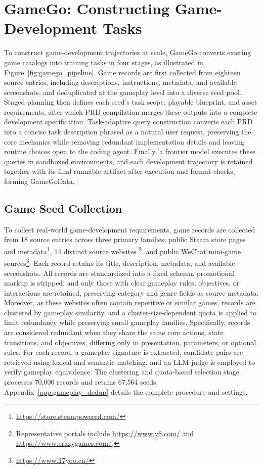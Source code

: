 \documentclass{article}
\begin{document}
\vspace{-3pt}
\section{GameGo: Constructing Game-Development Tasks}
\label{sec:method}
\vspace{-3pt}

To construct game-development trajectories at scale, GameGo converts existing game catalogs into training tasks in four stages, as illustrated in Figure~\ref{fig:gamego_pipeline}. Game records are first collected from eighteen source entries, including descriptions, instructions, metadata, and available screenshots, and deduplicated at the gameplay level into a diverse seed pool. Staged planning then defines each seed's task scope, playable blueprint, and asset requirements, after which PRD compilation merges these outputs into a complete development specification. Task-adaptive query construction converts each PRD into a concise task description phrased as a natural user request, preserving the core mechanics while removing redundant implementation details and leaving routine choices open to the coding agent. Finally, a frontier model executes these queries in sandboxed environments, and each development trajectory is retained together with its final runnable artifact after execution and format checks, forming GameGoData.

\vspace{-3pt}
\subsection{Game Seed Collection}
\label{sec:seed_collection}
\vspace{-3pt}

To collect real-world game-development requirements, game records are collected from 18 source entries across three primary families: public Steam store pages and metadata\footnote{\url{https://store.steampowered.com/}}, 14 distinct source websites \footnote{Representative portals include \url{https://www.y8.com/} and \url{https://www.crazygames.com/}.}, and public WeChat mini-game sources\footnote{\url{https://www.17yoo.cn/}}. Each record retains its title, description, metadata, and available screenshots. All records are standardized into a fixed schema, promotional markup is stripped, and only those with clear gameplay rules, objectives, or interactions are retained, preserving category and genre fields as source metadata. Moreover, as these websites often contain repetitive or similar games, records are clustered by gameplay similarity, and a cluster-size-dependent quota is applied to limit redundancy while preserving small gameplay families. Specifically, records are considered redundant when they share the same core actions, state transitions, and objectives, differing only in presentation, parameters, or optional rules. For each record, a gameplay signature is extracted, candidate pairs are retrieved using lexical and semantic matching, and an LLM judge is employed to verify gameplay equivalence. The clustering and quota-based selection stage processes 70{,}000 records and retains 67{,}564 seeds. Appendix~\ref{app:gameplay_dedup} details the complete procedure and settings.
\end{document}
